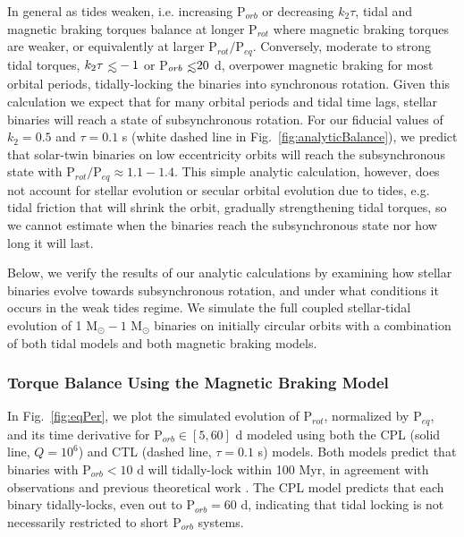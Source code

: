 \documentclass[twocolumn]{aastex61}
\def\lsim{~\rlap{$<$}{\lower 1.0ex\hbox{$\sim$}}}
\begin{document}
In general as tides weaken, i.e. increasing P$_{orb}$ or decreasing $k_2 \tau$, tidal and magnetic braking torques balance at longer P$_{rot}$ where magnetic braking torques are weaker, or equivalently at larger P$_{rot}/$P$_{eq}$. Conversely, moderate to strong tidal torques, $k_2 \tau \lsim -1$ or P$_{orb} \lsim 20$ d, overpower magnetic braking for most orbital periods, tidally-locking the binaries into synchronous rotation. Given this calculation we expect that for many orbital periods and tidal time lags, stellar binaries will reach a state of subsynchronous rotation. For our fiducial values of $k_2 = 0.5$ and $\tau = 0.1$ s (white dashed line in Fig.~\ref{fig:analyticBalance}), we predict that solar-twin binaries on low eccentricity orbits will reach the subsynchronous state with P$_{rot}/$P$_{eq} \approx 1.1-1.4$. This simple analytic calculation, however, does not account for stellar evolution or secular orbital evolution due to tides, e.g. tidal friction that will shrink the orbit, gradually strengthening tidal torques, so we cannot estimate when the binaries reach the subsynchronous state nor how long it will last.  

Below, we verify the results of our analytic calculations by examining how stellar binaries evolve towards subsynchronous rotation, and under what conditions it occurs in the weak tides regime. We simulate the full coupled stellar-tidal evolution of 1 M$_{\odot} - 1$ M$_{\odot}$ binaries on initially circular orbits with a combination of both tidal models and both magnetic braking models.

\subsubsection{Torque Balance Using the \citet{Matt2015} Magnetic Braking Model} \label{sec:mattBalance}

In Fig.~\ref{fig:eqPer}, we plot the simulated evolution of P$_{rot}$, normalized by P$_{eq}$, and its time derivative for P$_{orb} \in [5,60]$ d modeled using both the CPL (solid line, $Q=10^6$) and CTL (dashed line, $\tau = 0.1$ s) models. Both models predict that binaries with P$_{orb} < 10$ d will tidally-lock within 100 Myr, in agreement with observations \citep{Meibom2005} and previous theoretical work \citep{Zahn1989}. The CPL model predicts that each binary tidally-locks, even out to P$_{orb} = 60$ d, indicating that tidal locking is not necessarily restricted to short P$_{orb}$ systems. 
\end{document}

